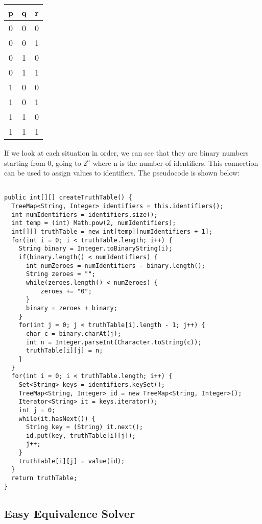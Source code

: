 \documentclass{report}
\begin{document}
\begin{center}
  \begin{tabular}{| c | c | c |}
    \hline
    p & q & r\\ \hline
    0 & 0 & 0 \\
    0 & 0 & 1 \\
		0 & 1 & 0 \\
		0 & 1 & 1 \\
		1 & 0 & 0 \\
		1 & 0 & 1 \\
    1 & 1 & 0 \\
    1 & 1 & 1 \\ \hline
  \end{tabular}
\end{center}

If we look at each situation in order, we can see that they are binary numbers
starting from 0, going to $2^n$ where n is the number of identifiers. This
connection can be used to assign values to identifiers. The pseudocode is shown
below:

\begin{lstlisting}

public int[][] createTruthTable() {
  TreeMap<String, Integer> identifiers = this.identifiers();
  int numIdentifiers = identifiers.size();
  int temp = (int) Math.pow(2, numIdentifiers);
  int[][] truthTable = new int[temp][numIdentifiers + 1];
  for(int i = 0; i < truthTable.length; i++) {
    String binary = Integer.toBinaryString(i);
    if(binary.length() < numIdentifiers) {
      int numZeroes = numIdentifiers - binary.length();
      String zeroes = "";
      while(zeroes.length() < numZeroes) {
	      zeroes += "0";
      }
      binary = zeroes + binary;
    }
    for(int j = 0; j < truthTable[i].length - 1; j++) {
      char c = binary.charAt(j);
      int n = Integer.parseInt(Character.toString(c));
      truthTable[i][j] = n;
    }
  }
  for(int i = 0; i < truthTable.length; i++) {
    Set<String> keys = identifiers.keySet();
    TreeMap<String, Integer> id = new TreeMap<String, Integer>();
    Iterator<String> it = keys.iterator();
    int j = 0;
    while(it.hasNext()) {
      String key = (String) it.next();
      id.put(key, truthTable[i][j]);
      j++;
    }
    truthTable[i][j] = value(id);
  }
  return truthTable;
}

\end{lstlisting}

\subsection{Easy Equivalence Solver}
\end{document}
